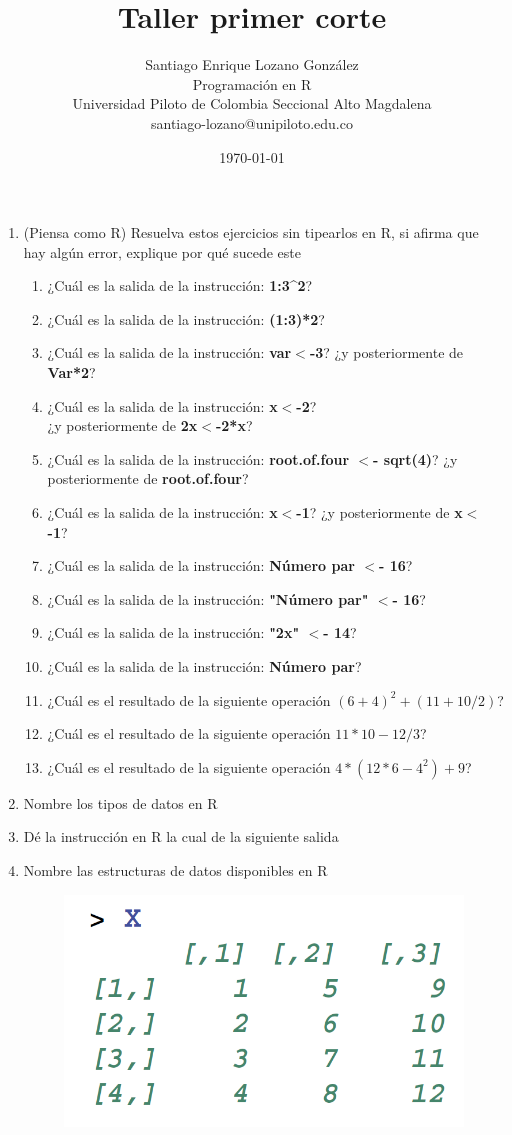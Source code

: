 \documentclass[12pt]{article} %
\title{Taller primer corte}
\author{Santiago Enrique Lozano González \\
	Programación en R \\
	Universidad Piloto de Colombia Seccional Alto Magdalena  \\
	santiago-lozano@unipiloto.edu.co \\
	}
\date{\today}
\begin{document}
\maketitle
\begin{enumerate}
\item (Piensa como R) Resuelva estos ejercicios sin tipearlos en R, si afirma que hay algún error, explique por qué sucede este
\begin{enumerate}
\item ¿Cuál es la salida de la instrucción: \textbf{1:3\^{}2}?
\item ¿Cuál es la salida de la instrucción: \textbf{(1:3)*2}?
\item ¿Cuál es la salida de la instrucción: \textbf{var$<$-3}? ¿y posteriormente de \textbf{Var*2}?
\item ¿Cuál es la salida de la instrucción: \textbf{x$<$-2}? \\
¿y posteriormente de \textbf{2x$<$-2*x}?
\item ¿Cuál es la salida de la instrucción: \textbf{root.of.four $<$- sqrt(4)}? ¿y posteriormente de \textbf{root.of.four}?
\item ¿Cuál es la salida de la instrucción: \textbf{x$<$-1}? ¿y posteriormente de \textbf{x$<$ -1}?
\item ¿Cuál es la salida de la instrucción: \textbf{Número par $<$- 16}?
\item ¿Cuál es la salida de la instrucción: \textbf{"Número par" $<$- 16}?
\item ¿Cuál es la salida de la instrucción: \textbf{"2x" $<$- 14}?
\item ¿Cuál es la salida de la instrucción: \textbf{Número par}?
\item ¿Cuál es el resultado de la siguiente operación $(6+4)^2+(11+10/2)$?
\item ¿Cuál es el resultado de la siguiente operación $11*10-12/3$?
\item ¿Cuál es el resultado de la siguiente operación $4*(12*6-4^2)+9$?
\end{enumerate}
\item Nombre los tipos de datos en R
\item Dé la instrucción en R la cual de la siguiente salida
\item Nombre las estructuras de datos disponibles en R
\begin{center}
\begin{figure}
\includegraphics[scale=0.44]{matriz.png}

\end{figure}
\end{center}
\end{enumerate}
\end{document}
